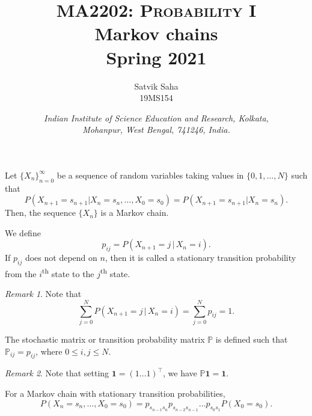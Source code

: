 \documentclass[11pt]{article}
\title{
    \Large\textsc{MA2202: Probability I} \\
    \Huge \textbf{Markov chains} \\
    \vspace{5pt}
    \Large{Spring 2021}
}
\author{
    \large Satvik Saha%
    \\\textsc{\small 19MS154}
}
\date{\normalsize
    \textit{Indian Institute of Science Education and Research, Kolkata, \\
    Mohanpur, West Bengal, 741246, India.} \\
}
\renewcommand\vec[1]{\boldsymbol{#1}}
\def\mP{\mathbb{P}}
\theoremstyle{definition}
\theoremstyle{remark}
\newtheorem*{remark}{Remark}
\numberwithin{equation}{module}
\begin{document}
    \maketitle

    \begin{definition}
        Let $\{X_n\}_{n = 0}^\infty$ be a sequence of random variables taking values
        in $\{0, 1, \dots, N\}$ such that \[
            P(X_{n + 1} = s_{n + 1} | X_{n} = s_n, \dots, X_0 = s_0) = P(X_{n + 1} =
            s_{n + 1} | X_n = s_n).
        \] Then, the sequence $\{X_n\}$ is a Markov chain.
    \end{definition}

    \begin{definition}
        We define \[
            p_{ij} = P(X_{n + 1} = j \,|\, X_n = i).
        \] If $p_{ij}$ does not depend on $n$, then it is called a stationary
        transition probability from the $i$\textsuperscript{th} state to the
        $j$\textsuperscript{th} state.
        \begin{remark}
            Note that \[
                \sum_{j = 0}^N P(X_{n + 1} = j \,|\, X_n = i) = \sum_{j = 0}^N
                p_{ij} = 1.
            \] 
        \end{remark}
    \end{definition}

    \begin{definition}
        The stochastic matrix or transition probability matrix $\mP$ is
        defined such that $\mP_{ij} = p_{ij}$, where $0 \leq i, j \leq N$.
        \begin{remark}
            Note that setting $\vec{1} = (1 \dots 1)^\top$, we have $\mP\vec{1} =
            \vec{1}$.
        \end{remark}
    \end{definition}

    \begin{lemma}
        For a Markov chain with stationary transition probabilities,
        \[
            P(X_n = s_n, \dots, X_0 = s_0) = p_{s_{n - 1}s_n}p_{s_{n - 2}s_{n -
            1}}\dots p_{s_0s_1}P(X_0 = s_0).
        \] 
    \end{lemma}
\end{document}
